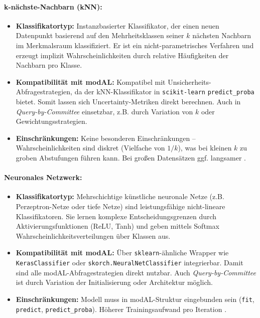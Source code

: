 \documentclass{article}
\begin{document}
\paragraph{k-nächste-Nachbarn (kNN):}
\begin{itemize}
	\item \textbf{Klassifikatortyp:} Instanzbasierter Klassifikator, der einen neuen Datenpunkt basierend auf den Mehrheitsklassen seiner $k$ nächsten Nachbarn im Merkmalsraum klassifiziert. Er ist ein nicht-parametrisches Verfahren und erzeugt implizit Wahrscheinlichkeiten durch relative Häufigkeiten der Nachbarn pro Klasse.
	\item \textbf{Kompatibilität mit modAL:} Kompatibel mit Unsicherheits-Abfragestrategien, da der kNN-Klassifikator in \texttt{scikit-learn} \texttt{predict\_proba} bietet. Somit lassen sich Uncertainty-Metriken direkt berechnen. Auch in \emph{Query-by-Committee} einsetzbar, z.B. durch Variation von $k$ oder Gewichtungsstrategien.
	\item \textbf{Einschränkungen:} Keine besonderen Einschränkungen – Wahrscheinlichkeiten sind diskret (Vielfache von $1/k$), was bei kleinen $k$ zu groben Abstufungen führen kann. Bei großen Datensätzen ggf. langsamer
	\cite{Cover1967}.
\end{itemize}

\paragraph{Neuronales Netzwerk:}
\begin{itemize}
	\item \textbf{Klassifikatortyp:} Mehrschichtige künstliche neuronale Netze (z.B. Perzeptron-Netze oder tiefe Netze) sind leistungsfähige nicht-lineare Klassifikatoren. Sie lernen komplexe Entscheidungsgrenzen durch Aktivierungsfunktionen (ReLU, Tanh) und geben mittels Softmax Wahrscheinlichkeitsverteilungen über Klassen aus.
	\item \textbf{Kompatibilität mit modAL:} Über \texttt{sklearn}-ähnliche Wrapper wie \texttt{KerasClassifier} oder \texttt{skorch.NeuralNetClassifier} integrierbar. Damit sind alle modAL-Abfragestrategien direkt nutzbar. Auch \emph{Query-by-Committee} ist durch Variation der Initialisierung oder Architektur möglich.
	\item \textbf{Einschränkungen:} Modell muss in modAL-Struktur eingebunden sein (\texttt{fit}, \texttt{predict}, \texttt{predict\_proba}). Höherer Trainingsaufwand pro Iteration
	\cite{LeCun2015}.
\end{itemize}
\end{document}
